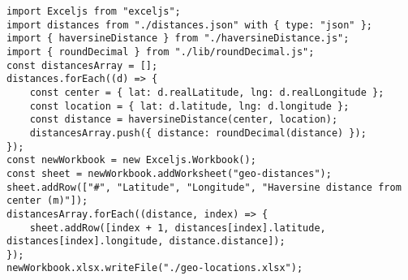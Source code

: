 \begin{verbatim}
import Exceljs from "exceljs";
import distances from "./distances.json" with { type: "json" };
import { haversineDistance } from "./haversineDistance.js";
import { roundDecimal } from "./lib/roundDecimal.js";
const distancesArray = [];
distances.forEach((d) => {
    const center = { lat: d.realLatitude, lng: d.realLongitude };
    const location = { lat: d.latitude, lng: d.longitude };
    const distance = haversineDistance(center, location);
    distancesArray.push({ distance: roundDecimal(distance) });
});
const newWorkbook = new Exceljs.Workbook();
const sheet = newWorkbook.addWorksheet("geo-distances");
sheet.addRow(["#", "Latitude", "Longitude", "Haversine distance from center (m)"]);
distancesArray.forEach((distance, index) => {
    sheet.addRow([index + 1, distances[index].latitude, distances[index].longitude, distance.distance]);
});
newWorkbook.xlsx.writeFile("./geo-locations.xlsx");
\end{verbatim}

